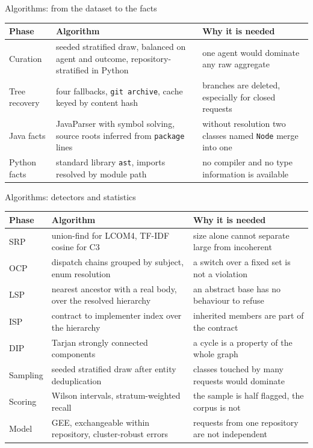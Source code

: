 \documentclass[11pt,aspectratio=169]{beamer}
\begin{document}
\begin{frame}{Algorithms: from the dataset to the facts}
\centering
\footnotesize
\begin{tabular}{@{}L{2.5cm}L{5.3cm}L{4.6cm}@{}}
\toprule
\textbf{Phase} & \textbf{Algorithm} & \textbf{Why it is needed} \\
\midrule
Curation & seeded stratified draw, balanced on agent and outcome, repository-stratified in Python &
one agent would dominate any raw aggregate \\
\addlinespace
Tree recovery & four fallbacks, \texttt{git archive}, cache keyed by content hash & branches are
deleted, especially for closed requests \\
\addlinespace
Java facts & JavaParser with symbol solving, source roots inferred from \texttt{package} lines &
without resolution two classes named \texttt{Node} merge into one \\
\addlinespace
Python facts & standard library \texttt{ast}, imports resolved by module path & no compiler and no
type information is available \\
\bottomrule
\end{tabular}
\end{frame}

\begin{frame}{Algorithms: detectors and statistics}
\centering
\scriptsize
\begin{tabular}{@{}L{2.5cm}L{5.3cm}L{4.6cm}@{}}
\toprule
\textbf{Phase} & \textbf{Algorithm} & \textbf{Why it is needed} \\
\midrule
SRP & union-find for LCOM4, TF-IDF cosine for C3 & size alone cannot separate large from
incoherent \\
OCP & dispatch chains grouped by subject, enum resolution & a switch over a fixed set is not a
violation \\
LSP & nearest ancestor with a real body, over the resolved hierarchy & an abstract base has no
behaviour to refuse \\
ISP & contract to implementer index over the hierarchy & inherited members are part of the
contract \\
DIP & Tarjan strongly connected components & a cycle is a property of the whole graph \\
\addlinespace
Sampling & seeded stratified draw after entity deduplication & classes touched by many requests
would dominate \\
Scoring & Wilson intervals, stratum-weighted recall & the sample is half flagged, the corpus is
not \\
Model & GEE, exchangeable within repository, cluster-robust errors & requests from one repository
are not independent \\
\bottomrule
\end{tabular}
\end{frame}
\end{document}
